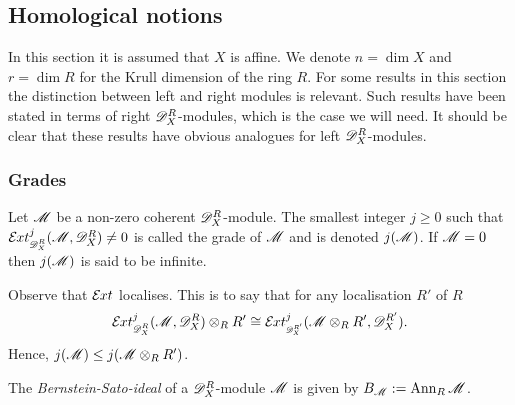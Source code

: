 \subsection{Homological notions}\label{sec: HomNotion}
In this section it is assumed that $X$ is affine.
We denote $n = \dim X$ and $r = \dim R$ for the Krull dimension of the ring $R$.
For some results in this section the distinction between left and right modules is relevant.
Such results have been stated in terms of right $\mathscr{D}_X^R$-modules, which is the case we will need. It should be clear that these results have obvious analogues for left $\mathscr{D}_X^R$-modules.

\subsubsection{Grades}
\begin{definition}
  Let $\mathscr{M}$ be a non-zero coherent $\mathscr{D}_X^R$-module. The smallest integer $j\geq 0$ such that $\Ex{\D_X^R}{j}(\M,\D_X^R) \neq 0$ is called the grade of $\mathscr{M}$ and is denoted $j(\mathscr{M})$. If $\mathscr{M} = 0$ then $j(\mathscr{M})$ is said to be infinite.
\end{definition}
\begin{remark}
  Observe that $\mathcal{E}\mkern -1mu xt$ localises. This is to say that for any localisation $R'$ of $R$ $$\Ex{\D_X^R}{j}(\M,\D_X^R)\otimes_R R' \cong \Ex{\D_X^{R'}}{j}(\M\otimes_R R',\D_X^{R'}).$$
  Hence, $j(\mathscr{M})\leq j(\mathscr{M}\otimes_R R')$.
\end{remark}
\begin{definition}\label{def: BSIdeal}
  The {\it Bernstein-Sato-ideal} of a $\mathscr{D}_X^R$-module $\mathscr{M}$ is given by $B_{\mathscr{M}}:=\operatorname{Ann}_R \mathscr{M}$.
\end{definition}

